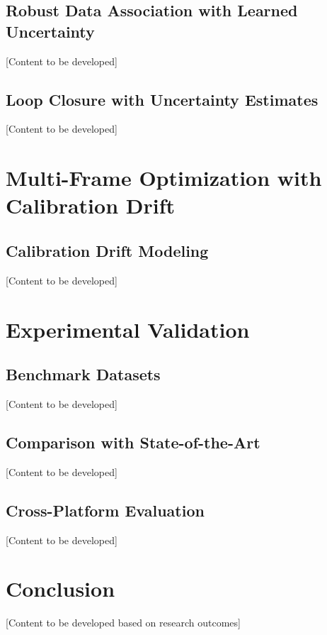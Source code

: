 \subsection{Robust Data Association with Learned Uncertainty}

[Content to be developed]

\subsection{Loop Closure with Uncertainty Estimates}

[Content to be developed]

\section{Multi-Frame Optimization with Calibration Drift}

\subsection{Calibration Drift Modeling}

[Content to be developed]

\section{Experimental Validation}

\subsection{Benchmark Datasets}

[Content to be developed]

\subsection{Comparison with State-of-the-Art}

[Content to be developed]

\subsection{Cross-Platform Evaluation}

[Content to be developed]

\section{Conclusion}

[Content to be developed based on research outcomes]